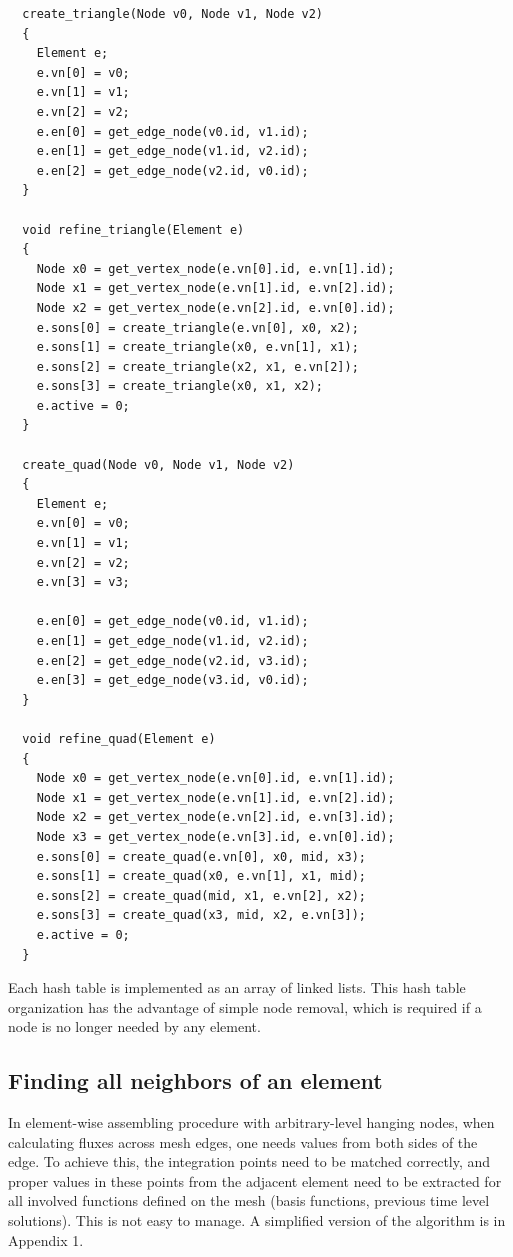 \begin{lstlisting}
  create_triangle(Node v0, Node v1, Node v2)
  {
    Element e;
    e.vn[0] = v0;
    e.vn[1] = v1;
    e.vn[2] = v2;
    e.en[0] = get_edge_node(v0.id, v1.id);
    e.en[1] = get_edge_node(v1.id, v2.id);
    e.en[2] = get_edge_node(v2.id, v0.id);
  }
  
  void refine_triangle(Element e)
  {
    Node x0 = get_vertex_node(e.vn[0].id, e.vn[1].id);
    Node x1 = get_vertex_node(e.vn[1].id, e.vn[2].id);
    Node x2 = get_vertex_node(e.vn[2].id, e.vn[0].id);
    e.sons[0] = create_triangle(e.vn[0], x0, x2);
    e.sons[1] = create_triangle(x0, e.vn[1], x1);
    e.sons[2] = create_triangle(x2, x1, e.vn[2]);
    e.sons[3] = create_triangle(x0, x1, x2);
    e.active = 0;
  }

  create_quad(Node v0, Node v1, Node v2)
  {
    Element e;
    e.vn[0] = v0;
    e.vn[1] = v1;
    e.vn[2] = v2;
    e.vn[3] = v3;

    e.en[0] = get_edge_node(v0.id, v1.id);
    e.en[1] = get_edge_node(v1.id, v2.id);
    e.en[2] = get_edge_node(v2.id, v3.id);
    e.en[3] = get_edge_node(v3.id, v0.id);
  }
  
  void refine_quad(Element e)
  {
    Node x0 = get_vertex_node(e.vn[0].id, e.vn[1].id);
    Node x1 = get_vertex_node(e.vn[1].id, e.vn[2].id);
    Node x2 = get_vertex_node(e.vn[2].id, e.vn[3].id);
    Node x3 = get_vertex_node(e.vn[3].id, e.vn[0].id);
    e.sons[0] = create_quad(e.vn[0], x0, mid, x3);
    e.sons[1] = create_quad(x0, e.vn[1], x1, mid);
    e.sons[2] = create_quad(mid, x1, e.vn[2], x2);
    e.sons[3] = create_quad(x3, mid, x2, e.vn[3]);
    e.active = 0;
  }
\end{lstlisting}

Each hash table is implemented as an array of linked lists. 
This hash table organization has the advantage of simple node
removal, which is required if a node is no longer needed by any element.

\subsection{Finding all neighbors of an element}
In element-wise assembling procedure with arbitrary-level hanging nodes, when calculating fluxes across mesh edges, one needs values from both sides of the edge. To achieve this, the integration points need to be matched correctly, and proper values in these points from the adjacent element need to be extracted for all involved functions defined on the mesh (basis functions, previous time level solutions). This is not easy to manage. A simplified version of the algorithm is in Appendix 1.

